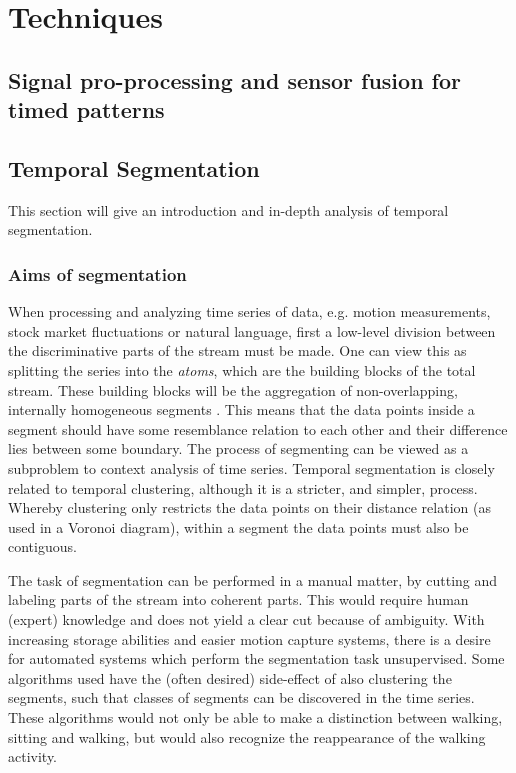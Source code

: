 
\chapter{Techniques} %

\label{Chapter2} %



\section{Signal pro-processing and sensor fusion for timed patterns}

\section{Temporal Segmentation}

This section will give an introduction and in-depth analysis of temporal 
segmentation.

\subsection{Aims of segmentation}
When processing and analyzing time series of data, e.g. motion measurements, 
stock market fluctuations or natural language, first a low-level division 
between the discriminative parts of the stream must be made. One can view this 
as splitting the series into the \emph{atoms}, which are the building blocks 
of the total stream. These building blocks will be the aggregation of 
non-overlapping, internally homogeneous segments \cite{himberg2001time}. This 
means that the data points inside a segment should have some resemblance 
relation to each other and their difference lies between some boundary. The 
process of segmenting can be viewed as a subproblem to context analysis of 
time series. Temporal segmentation is closely related to temporal clustering, 
although it is a stricter, and simpler, process. Whereby clustering only 
restricts the data points on their distance relation (as used in a Voronoi 
diagram), within a segment the data points must also be contiguous.

The task of segmentation can be performed in a manual 
matter, by cutting and labeling parts of the stream into coherent parts. This 
would require human (expert) knowledge and does not yield a clear cut because 
of ambiguity. With increasing storage abilities and easier motion capture 
systems, there is a desire for automated systems which perform the 
segmentation task unsupervised. Some algorithms used have the (often desired) 
side-effect of also clustering the segments, such that classes of segments can 
be discovered in the time series. These algorithms would not only be able to 
make a distinction between walking, sitting and walking, but would also 
recognize the reappearance of the walking activity.


